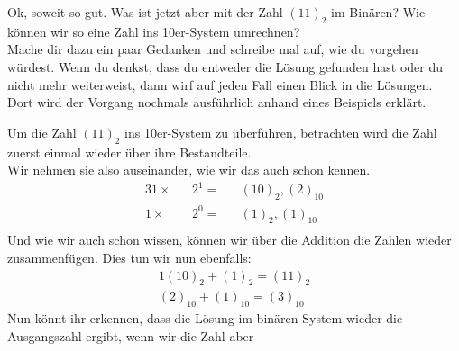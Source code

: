 \begin{exerciseseries}[columns=1,solsubrule=\hrule]{}
    \begin{exercise}
        Ok, soweit so gut. Was ist jetzt aber mit der Zahl $(11)_2$ im Binären? Wie können wir so eine Zahl ins 10er-System umrechnen?\\
        Mache dir dazu ein paar Gedanken und schreibe mal auf, wie du vorgehen würdest. Wenn du denkst, dass du entweder die Lösung gefunden
        hast oder du nicht mehr weiterweist, dann wirf auf jeden Fall einen Blick in die Lösungen. Dort wird der Vorgang nochmals ausführlich
        anhand eines Beispiels erklärt.\\
        \underline{\hspace{15cm}}
        \underline{\hspace{15cm}}
        \underline{\hspace{15cm}}
        \underline{\hspace{15cm}}
        \underline{\hspace{15cm}}
        \underline{\hspace{15cm}}
        \underline{\hspace{15cm}}
        \underline{\hspace{15cm}}
        \underline{\hspace{15cm}}
        \underline{\hspace{15cm}}
    \end{exercise}
    \begin{solution}
        Um die Zahl $(11)_2$ ins 10er-System zu überführen, betrachten wird die Zahl zuerst einmal wieder über ihre Bestandteile.\\
        Wir nehmen sie also auseinander, wie wir das auch schon kennen.\\
        \begin{alignat*}{3}
            1 \times && 2^1 = &&    (10)_2, (2)_{10} \\
            1 \times && 2^0 = &&     (1)_2, (1)_{10} \\
        \end{alignat*}
        Und wie wir auch schon wissen, können wir über die Addition die Zahlen wieder zusammenfügen. Dies tun wir nun ebenfalls:
        \begin{alignat*}{1}
            (10)_2 + (1)_2 = (11)_2 \\
            (2)_{10} + (1)_{10} = (3)_{10}
        \end{alignat*}
        Nun könnt ihr erkennen, dass die Lösung im binären System wieder die Ausgangszahl ergibt, wenn wir die Zahl aber

\end{solution}
\end{exerciseseries}
